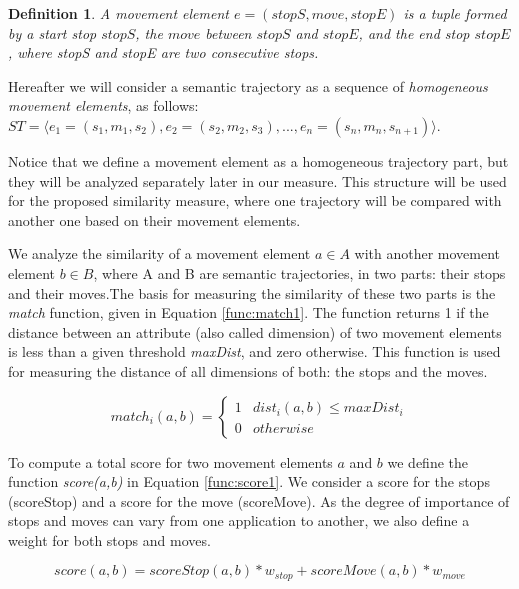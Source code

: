 \documentclass[12pt]{article}
\newtheorem{definition}{Definition}
\begin{document}
\begin{definition}
\label{def:movement_element}
A movement element  $e=(stopS, move, stopE)$ is a tuple formed by a start stop $stopS$, the $move$ between $stopS$ and  $stopE$, and the end stop $stopE$, where stopS and stopE are two consecutive stops.
\end{definition}


Hereafter we will consider a semantic trajectory as a sequence of \textit{homogeneous movement elements}, as follows: 
$ST=\langle e_1=(s_1,m_1,s_2), e_2=(s_2,m_2,s_3), ..., e_n=(s_n,m_n,s_{n+1}) \rangle$.

Notice that we define a movement element as a homogeneous trajectory part, but they will be analyzed separately later in our measure.
This structure will be used for the proposed similarity measure, where one trajectory will be compared with another one based on their movement elements.



We analyze the similarity of a movement element $a\in A$ with another movement element $b\in B$, where A and B are semantic trajectories, in two parts: their stops and their moves.The basis for measuring the similarity of these two parts is the \emph{match} function, given in Equation \ref{func:match1}. The function returns 1 if the distance between an attribute (also called dimension) of two movement elements is less than a given threshold \emph{maxDist}, and zero otherwise. This function is used for measuring the distance of all dimensions of both: the stops and the moves.

\begin{equation}
\label{func:match1}
  match_i(a, b) = 
  \begin{cases} 
      1 & dist_i(a, b) \leq maxDist_i \\
      0 & otherwise
  \end{cases}
\end{equation}

To compute a total score for two movement elements $a$ and $b$ we define the function \emph{score(a,b)} in Equation \ref{func:score1}. We consider a score for the stops (scoreStop) and a score for the move (scoreMove). As the degree of importance of stops and moves can vary from one application to another, we also define a weight for both stops and moves. 


\begin{equation}
\label{func:score1}
score(a, b) = scoreStop(a, b) * w_{stop} + scoreMove(a, b) * w_{move}  
\end{equation}
\end{document}
